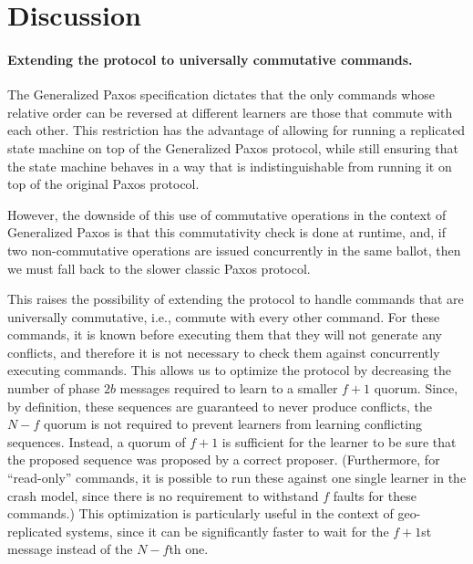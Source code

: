 \section{Discussion}
\label{sec:disc}

\paragraph{\textbf{Extending the protocol to universally commutative commands}.}

The Generalized Paxos specification dictates that the only commands
whose relative order can be reversed at different learners are those
that commute with each other. This restriction has the advantage of
allowing for running a replicated state machine on top of the
Generalized Paxos protocol, while still ensuring that the state
machine behaves in a way that is indistinguishable from running it on
top of the original Paxos protocol.

However, the downside of this use of commutative operations in the
context of Generalized Paxos is that this commutativity check is done
at runtime, and, if two non-commutative operations are issued
concurrently in the same ballot, then we must fall back to the slower
classic Paxos protocol.

This raises the possibility of extending the protocol to handle
commands that are universally commutative, i.e., commute with every
other command. For these commands, it is known before executing them
that they will not generate any conflicts, and therefore it is not
necessary to check them against concurrently executing commands.  This
allows us to optimize the protocol by decreasing the number of phase
$2b$ messages required to learn to a smaller $f+1$ quorum. Since, by
definition, these sequences are guaranteed to never produce conflicts,
the $N-f$ quorum is not required to prevent learners from learning
conflicting sequences. Instead, a quorum of $f+1$ is sufficient for
the learner to be sure that the proposed sequence was proposed by a
correct proposer. (Furthermore, for ``read-only'' commands, it is possible to run these
against one single learner in the crash model, since there is no
requirement to withstand $f$ faults for these commands.)
This optimization is particularly useful in the context of 
geo-replicated systems, since it can be significantly faster
to wait for the $f+1$st message instead of the $N-f$th one.

